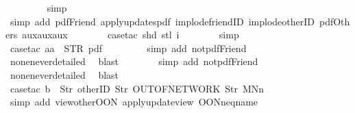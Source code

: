 \begin{isabellebody}
\ \ \ \ \ \ \ \isamarkupfalse%
\ simp\isanewline
\ \ \ \ \ \ \ \isamarkupfalse%
\ {\isacharparenleft}simp\ add{\isacharcolon}\ pdfFriend\ apply{\isacharunderscore}updates{\isacharunderscore}pdf\ implode{\isacharunderscore}friendID\ implode{\isacharunderscore}otherID\ pdfOther{\isacharunderscore}s{}\ aux{}{\isacharunderscore}aux{}{\isacharunderscore}aux{}{\isacharparenright}\isanewline
\ \ \ \ \ \ \isamarkupfalse%
\ {\isacharparenleft}case{\isacharunderscore}tac\ {\isachardoublequoteopen}shd\ {\isacharparenleft}stl\ i{\isacharparenright}{\isachardoublequoteclose}{\isacharparenright}\isanewline
\ \ \ \ \ \ \isamarkupfalse%
\ simp\isanewline
\ \ \ \ \ \ \isamarkupfalse%
\ {\isacharparenleft}case{\isacharunderscore}tac\ {\isachardoublequoteopen}aa\ {\isacharequal}\ STR\ {\isacharprime}{\isacharprime}pdf{\isacharprime}{\isacharprime}{\isachardoublequoteclose}{\isacharparenright}\isanewline
\ \ \ \ \ \ \ \isamarkupfalse%
\ {\isacharparenleft}simp\ add{\isacharcolon}\ not{\isacharunderscore}pdfFriend{\isacharparenright}\isanewline
\ \ \ \ \isamarkupfalse%
\ none{\isacharunderscore}never{\isacharunderscore}detailed\ \isamarkupfalse%
\ blast\isanewline
\ \ \ \ \ \ \isamarkupfalse%
\ {\isacharparenleft}simp\ add{\isacharcolon}\ not{\isacharunderscore}pdfFriend{\isacharunderscore}{}{\isacharparenright}\isanewline
\ \ \ \ \isamarkupfalse%
\ none{\isacharunderscore}never{\isacharunderscore}detailed\ \isamarkupfalse%
\ blast\isanewline
\isanewline
\ \ \ \ \ \isamarkupfalse%
\ {\isacharparenleft}case{\isacharunderscore}tac\ {\isachardoublequoteopen}b\ {\isacharequal}\ {\isacharbrackleft}Str\ {\isacharprime}{\isacharprime}otherID{\isacharprime}{\isacharprime}{\isacharcomma}\ Str\ {\isacharprime}{\isacharprime}OUT{\isacharunderscore}OF{\isacharunderscore}NETWORK{\isacharprime}{\isacharprime}{\isacharcomma}\ Str\ {\isacharprime}{\isacharprime}MNn{}{\isacharprime}{\isacharprime}{\isacharbrackright}{\isachardoublequoteclose}{\isacharparenright}\isanewline
\ \ \ \ \ \ \isamarkupfalse%
\ {\isacharparenleft}simp\ add{\isacharcolon}\ view{\isacharunderscore}other{\isacharunderscore}OON\ apply{\isacharunderscore}update{\isacharunderscore}view{}\ OON{\isacharunderscore}neq{\isacharunderscore}name{\isacharparenright}\isanewline
\ \ \ \ \ \ \isamarkupfalse%

\end{isabellebody}
